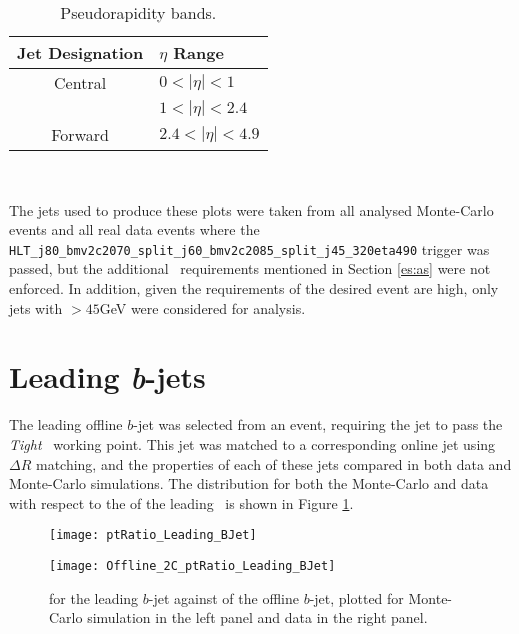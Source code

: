 	\begin{table}[h]
		\caption[Pseudorapidity bands of the object performance analysis]{Pseudorapidity bands.}
		\label{tab:etabands}
		\medskip
		\centering
		\begin{tabular}{cl}\toprule
			Jet Designation & $\eta$ Range \\\midrule
			Central & $0<|\eta|<1$ \\
			 & $1<|\eta|<2.4$  \\
			Forward & $2.4<|\eta|<4.9$ \\\bottomrule
		\end{tabular}\\[5pt]
	\end{table}

	The jets used to produce these plots were taken from all analysed Monte-Carlo events and all real data events where the \texttt{HLT\_j80\_bmv2c2070\_split\_\-j60\_bmv2c2085\_split\_j45\_320eta490} trigger was passed, but the additional \VBFHBB\, requirements mentioned in Section \ref{es:as} were not enforced. In addition, given the \pt requirements of the desired event are high, only jets with \pt$>45$GeV were considered for analysis.

\section{Leading \textit{b}-jets}
\label{OP:leadingb}

	The leading \pt offline $b$-jet was selected from an event, requiring the jet to pass the \textit{Tight} \btagging\ working point. This jet was matched to a corresponding online jet using $\Delta R$ matching, and the properties of each of these jets compared in both data and Monte-Carlo simulations. The \dptpt distribution for both the Monte-Carlo and data with respect to the \pt of the leading \bjet\ is shown in Figure \ref{fig:O:leadingbpt}.

		\begin{figure}[h]
			\centering
			\begin{minipage}[h]{0.48\linewidth}
				\texttt{[image: ptRatio\_Leading\_BJet]}

			\end{minipage}
			\quad
			\begin{minipage}[h]{0.48\linewidth}
				\texttt{[image: Offline\_2C\_ptRatio\_Leading\_BJet]}
			\end{minipage}
			\caption[\dptpt for the leading $b$-jet in data and Monte-Carlo simulations]{\dptpt for the leading \pt $b$-jet against \pt of the offline $b$-jet, plotted for Monte-Carlo simulation in the left panel and data in the right panel.}
			\label{fig:O:leadingbpt}
		\end{figure}

